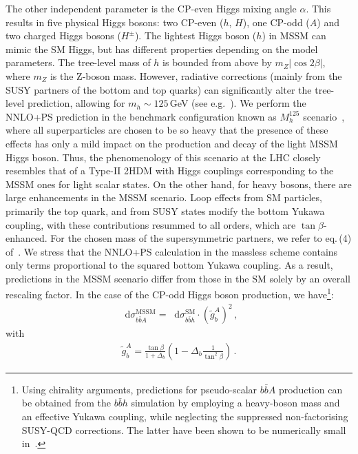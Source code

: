 \documentclass[11pt,a4paper]{article}
\newcommand{\dd}{\mathop{}\!\mathrm{d}}
\begin{document}
The other independent parameter is the CP-even Higgs mixing angle $\alpha$. This results in five physical Higgs bosons: two CP-even ($h$, $H$), one CP-odd ($A$) and two charged Higgs bosons ($H^{\pm}$). The lightest Higgs boson ($h$) in MSSM can mimic the SM Higgs, but has different properties depending on the model parameters. The tree-level mass of $h$ is bounded from above by $m_Z |\cos 2\beta|$, where $m_Z$ is the Z-boson mass. However, radiative corrections (mainly from the SUSY partners of the bottom and top quarks) can significantly alter the tree-level prediction, allowing for $m_h\sim 125$\,GeV (see e.g.~\cite{Slavich:2020zjv}). We perform the NNLO+PS prediction in the benchmark configuration known as $M_h^{125}$ scenario~\cite{Bagnaschi:2018ofa}, where all superparticles are chosen to be so heavy that the presence of these effects has only a mild impact on the production and decay of the light MSSM Higgs boson. Thus, the phenomenology of this scenario at the LHC closely resembles that of a Type-II 2HDM with Higgs couplings corresponding to the MSSM ones for light scalar states. On the other hand, for heavy bosons, there are large enhancements in the MSSM scenario. Loop effects from SM particles, primarily the top quark, and from SUSY states modify the bottom Yukawa coupling, with these contributions resummed to all orders, which are $\tan\beta$-enhanced. For the chosen mass of the supersymmetric partners, we refer to eq.\,(4) of~. We stress that the NNLO+PS calculation in the massless scheme contains only terms proportional to the squared bottom Yukawa coupling. As a result, \bbH{} predictions in the MSSM scenario differ from those in the SM solely by an overall rescaling factor. In the case of the CP-odd Higgs boson production, we have\footnote{Using chirality arguments, predictions for pseudo-scalar $b\bar bA$ production can be obtained from the $b\bar b h$ simulation by employing a heavy-boson mass and an effective Yukawa coupling, while neglecting the suppressed non-factorising SUSY-QCD corrections. The latter have been shown to be numerically small in~.}:
\begin{align}
	\dd \sigma_{b\bar b A}^{\text{MSSM}} = \dd \sigma_{b\bar b h}^{\text{SM}} \cdot (\tilde g_b^{A})^2\,,	\label{eq:BSMYuk}
\end{align}
with
\begin{align}
	\tilde{g}_b^A = \frac{\tan \beta}{1 + \Delta_b} \left( 1 - \Delta_b \frac{1}{\tan^2\beta} \right)\,.
\end{align}
\end{document}

